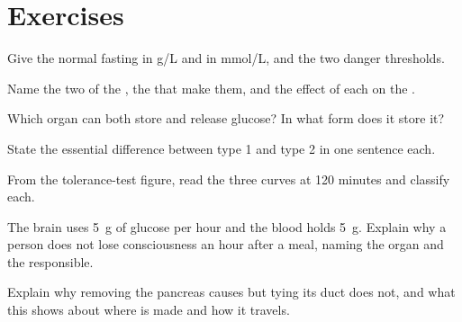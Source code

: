 \section{Exercises}

\begin{exercise}[$\star$]\label{exo:g12:glucose-and-diabetes:1}
Give the normal fasting  in \unit{g/L} and in \unit{mmol/L},
and the two danger thresholds.
\end{exercise}

\begin{exercise}[$\star$]\label{exo:g12:glucose-and-diabetes:2}
Name the two  of the , the  that make them, and the
effect of each on the .
\end{exercise}

\begin{exercise}[$\star$]\label{exo:g12:glucose-and-diabetes:3}
Which organ can both store and release glucose? In what form does it
store it?
\end{exercise}

\begin{exercise}[$\star$]\label{exo:g12:glucose-and-diabetes:4}
State the essential difference between type 1 and type 2  in
one sentence each.
\end{exercise}

\begin{exercise}[$\star$]\label{exo:g12:glucose-and-diabetes:5}
From the tolerance-test figure, read the three curves at 120 minutes
and classify each.
\end{exercise}

\begin{exercise}[$\star\star$]\label{exo:g12:glucose-and-diabetes:6}
The brain uses \qty{5}{g} of glucose per hour and the blood holds
\qty{5}{g}. Explain why a person does not lose consciousness an hour
after a meal, naming the organ and the  responsible.
\end{exercise}

\begin{exercise}[$\star\star$]\label{exo:g12:glucose-and-diabetes:7}
Explain why removing the pancreas causes  but tying its duct
does not, and what this shows about where  is made and how it
travels.
\end{exercise}

